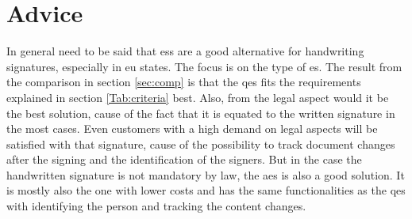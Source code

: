 \section{Advice}
In general need to be said that \glspl{es} are a good alternative for handwriting signatures, especially in \gls{eu} states. The focus is on the type of \gls{es}. The result from the comparison in section \ref{sec:comp} is that the \gls{qes} fits the requirements explained in section \ref{Tab:criteria} best. Also, from the legal aspect would it be the best solution, cause of the fact that it is equated to the written signature in the most cases. Even customers with a high demand on legal aspects will be satisfied with that signature, cause of the possibility to track document changes after the signing and the identification of the signers. But in the case the handwritten signature is not mandatory by law, the \gls{aes} is also a good solution. It is mostly also the one with lower costs and has the same functionalities as the \gls{qes} with identifying the person and tracking the content changes.